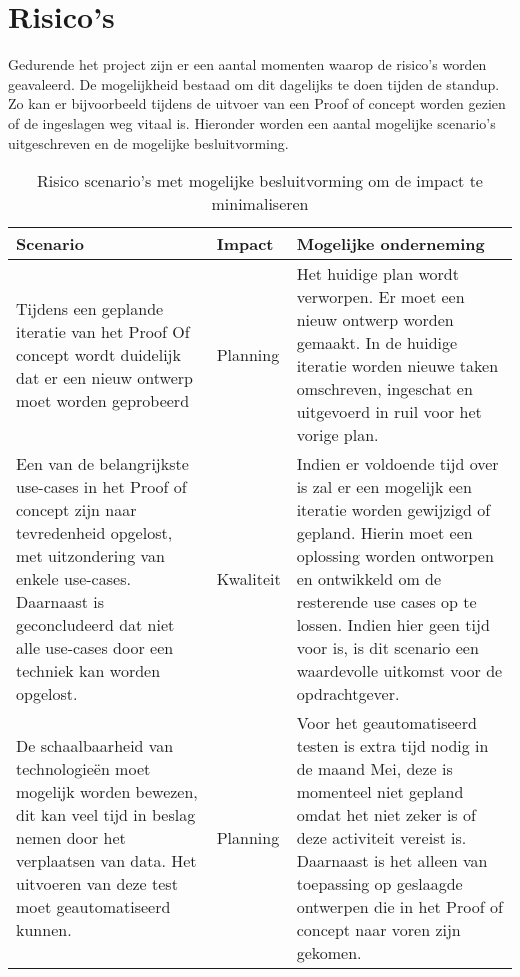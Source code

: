\newpage

\section{Risico's} %

Gedurende het project zijn er een aantal momenten waarop de risico’s worden geavaleerd. De mogelijkheid bestaad om dit dagelijks te doen tijden de standup. Zo kan er bijvoorbeeld tijdens de uitvoer van een Proof of concept worden gezien of de ingeslagen weg vitaal is.
Hieronder worden een aantal mogelijke scenario's uitgeschreven en de mogelijke besluitvorming.

\begin{table}[h!]
\centering
\caption{Risico scenario's met mogelijke besluitvorming om de impact te minimaliseren}
\label{my-label}
\def\arraystretch{1.5}
\begin{tabular}{|p{5cm}|l|p{8cm}|}
\hline
Scenario & Impact & Mogelijke onderneming \\ \hline
    Tijdens een geplande iteratie van het  Proof Of concept wordt duidelijk dat er een nieuw ontwerp moet worden geprobeerd
    & Planning 
    & Het huidige plan wordt verworpen. Er moet een nieuw ontwerp worden gemaakt. In de huidige iteratie worden nieuwe taken omschreven, ingeschat en uitgevoerd in ruil voor het vorige plan. \\
\hline
    Een van de belangrijkste use-cases in het Proof of concept zijn naar tevredenheid opgelost, met uitzondering van enkele use-cases. Daarnaast is geconcludeerd dat niet alle use-cases door een techniek kan worden opgelost.
    & Kwaliteit
    & Indien er voldoende tijd over is zal er een mogelijk een iteratie worden gewijzigd of gepland. Hierin moet een oplossing worden ontworpen en ontwikkeld om de resterende use cases op te lossen.  Indien hier geen tijd voor is, is dit scenario een waardevolle uitkomst voor de opdrachtgever. \\
\hline
    De schaalbaarheid van technologieën moet mogelijk worden bewezen, dit kan veel tijd in beslag nemen door het verplaatsen van data. Het uitvoeren van deze test moet geautomatiseerd kunnen.
    & Planning
    & Voor het geautomatiseerd testen is extra tijd nodig in de maand Mei, deze is momenteel niet gepland omdat het niet zeker is of deze activiteit vereist is. Daarnaast is het alleen van toepassing op geslaagde ontwerpen die in het Proof of concept naar voren zijn gekomen. \\
\hline
\end{tabular}
\end{table}

